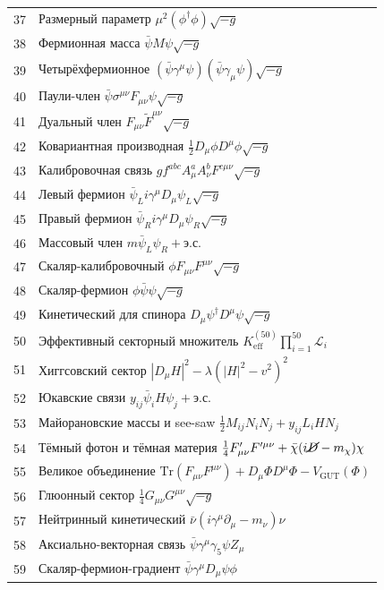 \documentclass[12pt,a4paper]{article}
\begin{document}
\begin{longtable}{r l}
		37 & Размерный параметр \(\mu^2(\phi^\dagger\phi)\sqrt{-g}\) \\
		38 & Фермионная масса \(\bar{\psi}M\psi\sqrt{-g}\) \\
		39 & Четырёхфермионное \((\bar{\psi}\gamma^\mu\psi)(\bar{\psi}\gamma_\mu\psi)\sqrt{-g}\) \\
		40 & Паули-член \(\bar{\psi}\sigma^{\mu\nu}F_{\mu\nu}\psi\sqrt{-g}\) \\
		41 & Дуальный член \(F_{\mu\nu}\tilde{F}^{\mu\nu}\sqrt{-g}\) \\
		42 & Ковариантная производная \(\frac{1}{2}D_\mu\phi D^\mu\phi\sqrt{-g}\) \\
		43 & Калибровочная связь \(g f^{abc}A^a_\mu A^b_\nu F^{c\mu\nu}\sqrt{-g}\) \\
		44 & Левый фермион \(\bar{\psi}_L i\gamma^\mu D_\mu\psi_L\sqrt{-g}\) \\
		45 & Правый фермион \(\bar{\psi}_R i\gamma^\mu D_\mu\psi_R\sqrt{-g}\) \\
		46 & Массовый член \(m\bar{\psi}_L\psi_R + \text{э.с.}\) \\
		47 & Скаляр-калибровочный \(\phi F_{\mu\nu}F^{\mu\nu}\sqrt{-g}\) \\
		48 & Скаляр-фермион \(\phi\bar{\psi}\psi\sqrt{-g}\) \\
		49 & Кинетический для спинора \(D_\mu\psi^\dagger D^\mu\psi\sqrt{-g}\) \\
		50 & Эффективный секторный множитель \(K^{(50)}_{\mathrm{eff}}\prod_{i=1}^{50}\mathcal{L}_i\) \\
		51 & Хиггсовский сектор \(|D_\mu H|^2 - \lambda(|H|^2 - v^2)^2\) \\
		52 & Юкавские связи \(y_{ij}\bar{\psi}_i H\psi_j + \text{э.с.}\) \\
		53 & Майорановские массы и see-saw \(\frac{1}{2}M_{ij}N_i N_j + y_{ij}L_i H N_j\) \\
		54 & Тёмный фотон и тёмная материя \(\frac{1}{4}F'_{\mu\nu}F'^{\mu\nu} + \bar{\chi}(i\cancel{D} - m_\chi)\chi\) \\
		55 & Великое объединение \(\mathrm{Tr}(F_{\mu\nu}F^{\mu\nu}) + D_\mu\Phi D^\mu\Phi - V_{\text{GUT}}(\Phi)\) \\
		56 & Глюонный сектор \(\frac{1}{4}G_{\mu\nu}G^{\mu\nu}\sqrt{-g}\) \\
		57 & Нейтринный кинетический \(\bar{\nu}(i\gamma^\mu\partial_\mu - m_\nu)\nu\) \\
		58 & Аксиально-векторная связь \(\bar{\psi}\gamma^\mu\gamma_5\psi Z_\mu\) \\
		59 & Скаляр-фермион-градиент \(\bar{\psi}\gamma^\mu D_\mu\psi\phi\) \\

\end{longtable}
\end{document}
